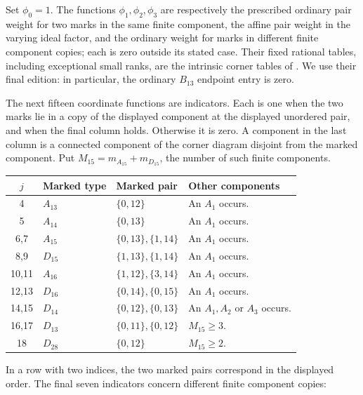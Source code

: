 \documentclass[11pt]{article}
\theoremstyle{definition}
\theoremstyle{remark}
\numberwithin{equation}{section}
\begin{document}
Set $\phi_0=1$. The functions $\phi_1,\phi_2,\phi_3$ are respectively
the prescribed ordinary pair weight for two marks in the same finite
component, the affine pair weight in the varying ideal factor, and
the ordinary weight for marks in different finite component copies;
each is zero outside its stated case. Their fixed rational tables,
including exceptional small ranks, are the intrinsic corner tables of
\cite{BoundsSupplement}. We use their final edition: in particular,
the ordinary $B_{13}$ endpoint entry is zero.

The next fifteen coordinate functions are indicators. Each is one when the two
marks lie in a copy of the displayed component at the displayed
unordered pair, and when the final column holds. Otherwise it is zero.
A component in the last column is a connected component of the
corner diagram disjoint from the marked component. Put
$M_{15}=m_{A_{15}}+m_{D_{15}}$, the number of such finite components.
\begin{center}\small
\begin{tabular}{cllp{}}
\toprule
$j$&Marked type&Marked pair&Other components\\\midrule
4&$A_{13}$&$\{0,12\}$&An $A_1$ occurs.\\
5&$A_{14}$&$\{0,13\}$&An $A_1$ occurs.\\
6,7&$A_{15}$&$\{0,13\},\{1,14\}$&An $A_1$ occurs.\\
8,9&$D_{15}$&$\{1,13\},\{1,14\}$&An $A_1$ occurs.\\
10,11&$A_{16}$&$\{1,12\},\{3,14\}$&An $A_1$ occurs.\\
12,13&$D_{16}$&$\{0,14\},\{0,15\}$&An $A_1$ occurs.\\
14,15&$D_{14}$&$\{0,12\},\{0,13\}$&An $A_1,A_2$ or $A_3$ occurs.\\
16,17&$D_{13}$&$\{0,11\},\{0,12\}$&$M_{15}\ge3$.\\
18&$D_{28}$&$\{0,12\}$&$M_{15}\ge2$.\\
\bottomrule
\end{tabular}
\end{center}
In a row with two indices, the two marked pairs correspond
in the displayed order.
The final seven indicators concern different finite component copies:
\end{document}
